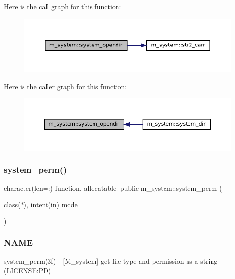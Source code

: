 Here is the call graph for this function\+:\nopagebreak
\begin{figure}[H]
\begin{center}
\leavevmode
\includegraphics[width=350pt]{namespacem__system_a622cc67c03e8cdea1d4c2430bb36081b_cgraph}
\end{center}
\end{figure}
Here is the caller graph for this function\+:\nopagebreak
\begin{figure}[H]
\begin{center}
\leavevmode
\includegraphics[width=350pt]{namespacem__system_a622cc67c03e8cdea1d4c2430bb36081b_icgraph}
\end{center}
\end{figure}
\mbox{\label{namespacem__system_ae8f39e1d4e420396319105e4e81f92b5}} 
\subsubsection{\texorpdfstring{system\+\_\+perm()}{system\_perm()}}
{\footnotesize\ttfamily character(len=\+:) function, allocatable, public m\+\_\+system\+::system\+\_\+perm (\begin{DoxyParamCaption}\item[{class($\ast$), intent(in)}]{mode }\end{DoxyParamCaption})}



\subsubsection*{N\+A\+ME}

system\+\_\+perm(3f) -\/ \mbox{[}M\+\_\+system\mbox{]} get file type and permission as a string (L\+I\+C\+E\+N\+SE\+:PD) 

